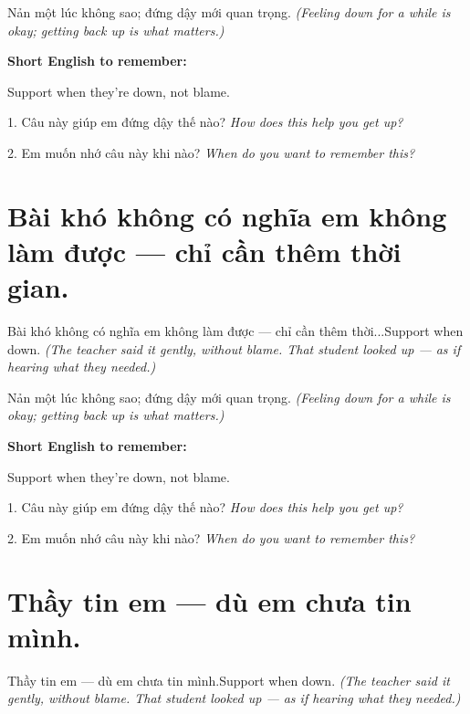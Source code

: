 \begin{baihoc}
Nản một lúc không sao; đứng dậy mới quan trọng.
\textit{(Feeling down for a while is okay; getting back up is what matters.)}
\end{baihoc}

\begin{ghinhoanh}
\textbf{Short English to remember:}

Support when they're down, not blame.

\end{ghinhoanh}

\begin{tuhocnhanh}
1. Câu này giúp em đứng dậy thế nào? \textit{How does this help you get up?}

2. Em muốn nhớ câu này khi nào? \textit{When do you want to remember this?}
\end{tuhocnhanh}
\ngancach


\section{Bài khó không có nghĩa em không làm được — chỉ cần thêm thời gian.}
\begin{truyen}{Bài khó không có nghĩa em không làm được — chỉ cần thêm thời...}{Support when down.}
\textit{(The teacher said it gently, without blame. That student looked up — as if hearing what they needed.)}
\end{truyen}

\begin{baihoc}
Nản một lúc không sao; đứng dậy mới quan trọng.
\textit{(Feeling down for a while is okay; getting back up is what matters.)}
\end{baihoc}

\begin{ghinhoanh}
\textbf{Short English to remember:}

Support when they're down, not blame.

\end{ghinhoanh}

\begin{tuhocnhanh}
1. Câu này giúp em đứng dậy thế nào? \textit{How does this help you get up?}

2. Em muốn nhớ câu này khi nào? \textit{When do you want to remember this?}
\end{tuhocnhanh}
\ngancach


\section{Thầy tin em — dù em chưa tin mình.}
\begin{truyen}{Thầy tin em — dù em chưa tin mình.}{Support when down.}
\textit{(The teacher said it gently, without blame. That student looked up — as if hearing what they needed.)}
\end{truyen}

